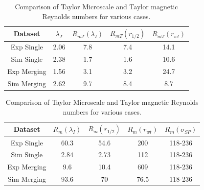 \documentclass[aip,prl,amsmath,amssymb,reprint,superscriptaddress]{revtex4-1} %
\begin{document}
\begin{table} [htbp]
\caption{\label{tab:Rms1}Comparison of Taylor Microscale and Taylor magnetic Reynolds numbers for various cases.}
\begin{tabular}{ccccc}
\toprule
Dataset								& $\lambda_{T}$	&$R_{mT}(\lambda_{I})$&$R_{mT}(r_{1/2})$&$R_{mT}(r_{wt})$\\
\hline
Exp Single  					& 2.06 					& 7.8 								& 7.4						&14.1\\
Sim Single  					& 2.38 					& 1.7 								& 1.6						&10.6\\
Exp Merging 					& 1.56 					& 3.1 								& 3.2						&24.7\\
Sim Merging 					& 2.62 					& 9.7 								& 8.4						&8.7\\
\hline
\end{tabular}
\end{table}

\begin{table} [htbp]
\caption{\label{tab:Rms2}Comparison of Taylor Microscale and Taylor magnetic Reynolds numbers for various cases.}
\begin{tabular}{ccccc}
\toprule
Dataset								&$R_{m}(\lambda_{I})$&$R_{m}(r_{1/2})$&$R_{m}(r_{wt})$&$R_{m}(\sigma_{SP})$\\
\hline
Exp Single  					& 60.3 								& 54.6						&200					&118-236\\
Sim Single  					& 2.84 								& 2.73						&112					&118-236\\
Exp Merging 					& 9.6 								& 10.4						&609					&118-236\\
Sim Merging 					& 93.6 								& 70							&76.5					&118-236\\
\hline
\end{tabular}
\end{table}
\end{document}

